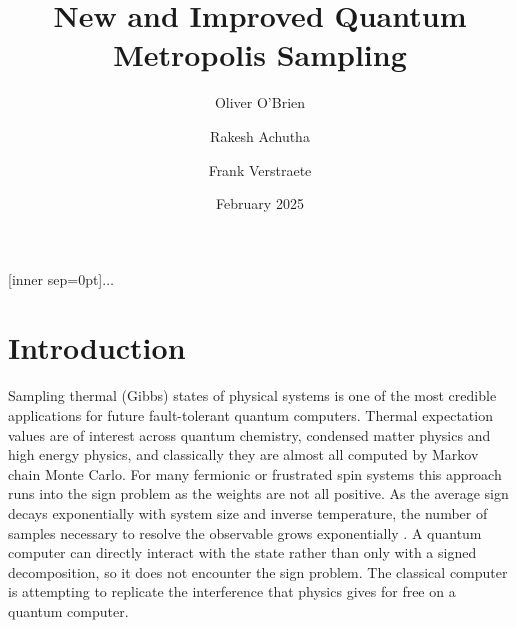 \documentclass[aps,floatfix,10pt,amssymb,amsfont,amsmath,superscriptaddress,float,nofootinbib,longbibliography,nobalancelastpage,twocolumn]{revtex4-2}
\date{February 2025}
\begin{document}
[inner sep=0pt]{$\dots$}

\title{New and Improved Quantum Metropolis Sampling}
\author{Oliver O'Brien}
\author{Rakesh Achutha}
\author{Frank Verstraete}

\begin{abstract}
\end{abstract}

\maketitle

\section{Introduction}
Sampling thermal (Gibbs) states of physical systems is one of the most credible applications for future fault-tolerant quantum computers. Thermal expectation values are of interest across quantum chemistry, condensed matter physics and high energy physics, and classically they are almost all computed by Markov chain Monte Carlo. For many fermionic or frustrated spin systems this approach runs into the sign problem as the weights are not all positive. As the average sign decays exponentially with system size and inverse temperature, the number of samples necessary to resolve the observable grows exponentially \cite{Troyer_2005}. A quantum computer can directly interact with the state rather than only with a signed decomposition, so it does not encounter the sign problem. The classical computer is attempting to replicate the interference that physics gives for free on a quantum computer.
\end{document}
